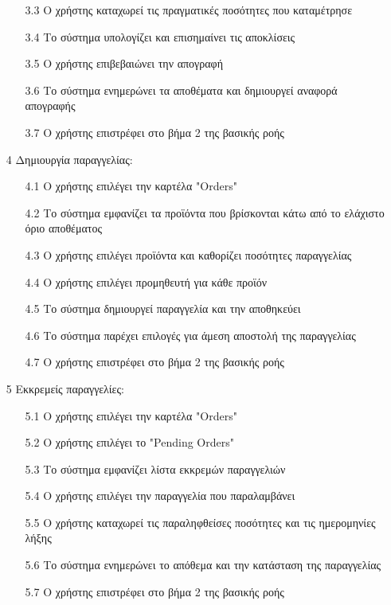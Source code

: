 \documentclass[12pt,a4paper,twoside]{book}
\begin{document}
\begin{enumerate}
\begin{enumerate}
          \item [3.3 ] Ο χρήστης καταχωρεί τις πραγματικές ποσότητες που καταμέτρησε
          \item [3.4 ] Το σύστημα υπολογίζει και επισημαίνει τις αποκλίσεις
          \item [3.5 ] Ο χρήστης επιβεβαιώνει την απογραφή
          \item [3.6 ] Το σύστημα ενημερώνει τα αποθέματα και δημιουργεί αναφορά απογραφής
          \item [3.7 ] Ο χρήστης επιστρέφει στο βήμα 2 της βασικής ροής
        \end{enumerate}
  \item[4 ] Δημιουργία παραγγελίας:
        \begin{enumerate}
          \item [4.1 ] Ο χρήστης επιλέγει την καρτέλα "Orders"
          \item [4.2 ] Το σύστημα εμφανίζει τα προϊόντα που βρίσκονται κάτω από το ελάχιστο όριο αποθέματος
          \item [4.3 ] Ο χρήστης επιλέγει προϊόντα και καθορίζει ποσότητες παραγγελίας
          \item [4.4 ] Ο χρήστης επιλέγει προμηθευτή για κάθε προϊόν
          \item [4.5 ] Το σύστημα δημιουργεί παραγγελία και την αποθηκεύει
          \item [4.6 ] Το σύστημα παρέχει επιλογές για άμεση αποστολή της παραγγελίας %
          \item [4.7 ] Ο χρήστης επιστρέφει στο βήμα 2 της βασικής ροής
        \end{enumerate}
  \item[5 ] Εκκρεμείς παραγγελίες:
        \begin{enumerate}
          \item [5.1 ] Ο χρήστης επιλέγει την καρτέλα "Orders"
          \item [5.2 ] Ο χρήστης επιλέγει το "Pending Orders"
          \item [5.3 ] Το σύστημα εμφανίζει λίστα εκκρεμών παραγγελιών
          \item [5.4 ] Ο χρήστης επιλέγει την παραγγελία που παραλαμβάνει
          \item [5.5 ] Ο χρήστης καταχωρεί τις παραληφθείσες ποσότητες και τις ημερομηνίες λήξης
          \item [5.6 ] Το σύστημα ενημερώνει το απόθεμα και την κατάσταση της παραγγελίας
          \item [5.7 ] Ο χρήστης επιστρέφει στο βήμα 2 της βασικής ροής

\end{enumerate}
\end{enumerate}
\end{document}
